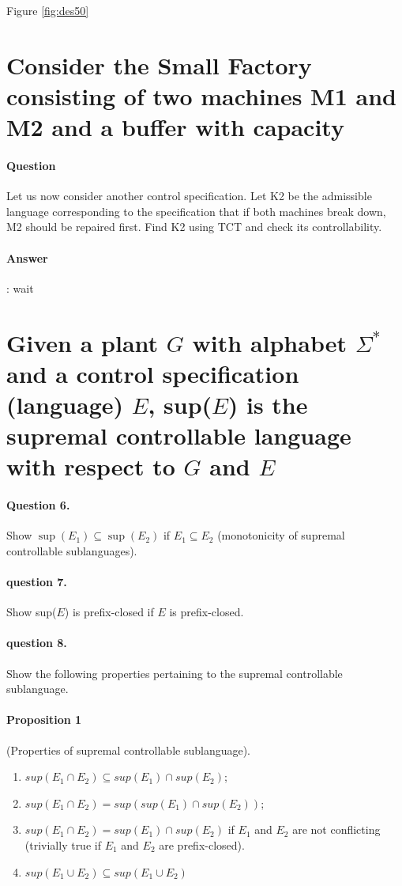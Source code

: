 \documentclass{article}
\begin{document}
Figure \ref{fig:des50}


\section{Consider the Small Factory consisting of two machines M1 and M2 and a buffer with capacity}

\paragraph{Question} Let us now consider another control specification. Let K2 be the admissible language corresponding to the specification that if both machines break down, M2 should be repaired first. Find K2 using TCT and check its controllability.

\paragraph{Answer}:
wait

\section{Given a plant $G$ with alphabet $\Sigma^*$ and a control specification (language) $E$, sup($E$) is the supremal controllable language with respect to $G$ and $E$}

\paragraph{Question 6.} Show $\sup \left(E_1\right) \subseteq \sup \left(E_2\right)$ if $E_1 \subseteq E_2$ (monotonicity of supremal controllable sublanguages).
\paragraph{question 7.} Show sup($E$) is prefix-closed if $E$ is prefix-closed.
\paragraph{question 8.} Show the following properties pertaining to the supremal controllable sublanguage.
\paragraph{Proposition 1} (Properties of supremal controllable sublanguage).
\begin{enumerate}
  \item $sup(E_1 \cap E_2) \subseteq sup(E_1) \cap sup(E_2)$;
  \item $sup(E_1 \cap E_2) = sup(sup(E_1) \cap sup(E_2))$;
  \item $sup(E_1 \cap E_2) = sup(E_1) \cap sup(E_2)$ if $E_1$ and $E_2$ are not conflicting (trivially true if $E_1$ and $E_2$ are prefix-closed).
  \item $sup(E_1 \cup E_2) \subseteq sup(E_1 \cup E_2)$
\end{enumerate}
\end{document}
